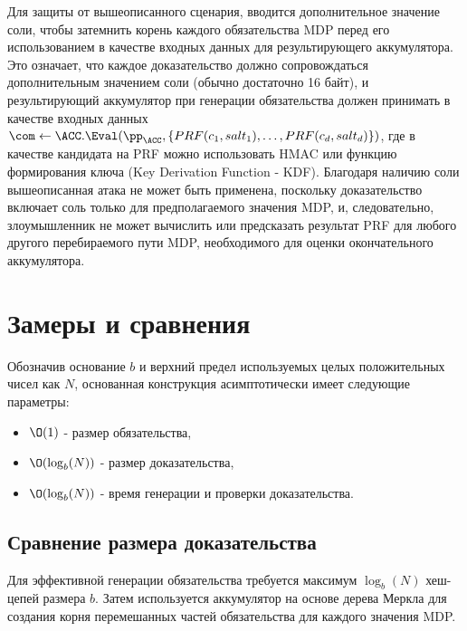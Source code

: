 Для защиты от вышеописанного сценария, вводится дополнительное значение соли, чтобы затемнить корень каждого обязательства MDP перед его использованием в качестве входных данных для результирующего аккумулятора.
Это означает, что каждое доказательство должно сопровождаться дополнительным значением соли (обычно достаточно 16 байт), и результирующий аккумулятор при генерации обязательства должен принимать в  качестве входных данных $\com \leftarrow \ACC.\Eval(\pp_\ACC, \{PRF(c_1, salt_1), \dots, PRF(c_d, salt_d)\})$, где в качестве кандидата на PRF можно использовать HMAC или функцию формирования ключа (Key Derivation Function - KDF).
Благодаря наличию соли вышеописанная атака не может быть применена, поскольку доказательство включает соль только для предполагаемого значения MDP, и, следовательно, злоумышленник не может вычислить или предсказать результат PRF для любого другого перебираемого пути MDP, необходимого для оценки окончательного аккумулятора.

\section{Замеры и сравнения}
Обозначив основание $b$ и верхний предел используемых целых положительных чисел как $N$, основанная конструкция асимптотически имеет следующие параметры:
\begin{itemize}
	\item $\O(1)$ - размер обязательства,
	\item $\O(\log_b(N))$ - размер доказательства,
	\item $\O(\log_b(N))$ - время генерации и проверки доказательства.
\end{itemize}

\subsection{Сравнение размера доказательства} %
Для эффективной генерации обязательства требуется максимум $\log_b(N)$ хеш-цепей размера $b$.
Затем используется аккумулятор на основе дерева Меркла для создания корня перемешанных частей обязательства для каждого значения MDP.

